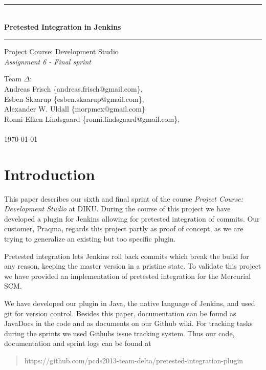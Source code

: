 \documentclass[a4paper,11pt]{article}
\makeatletter
\newcommand{\systemname}{Pretested Integration in Jenkins}
\newcommand{\groupname}{Team $\Delta$}
\newcommand{\groupmembers}{
	Andreas Frisch \{andreas.frisch@gmail.com\}, \\
	Esben Skaarup \{esben.skaarup@gmail.com\}, \\
	Alexander W. Uldall \{morpmex@gmail.com\} \\
	Ronni Elken Lindsgaard \{ronni.lindsgaard@gmail.com\}, \\
	~
}
\makeatother
\begin{document}
\begin{titlepage}
	\begin{center}
		\vspace*{4cm}
		\rule{\linewidth}{0.5mm}\\[0.4cm]
		{\huge \bfseries \systemname}
		\rule{\linewidth}{0.5mm}
	\end{center}
	\begin{flushleft}
		{
			\Large Project Course: Development Studio \\[0.1cm]
			{\it Assignment 6 - Final sprint}
		}
	\end{flushleft}
	\vspace*{4cm}
	
	\begin{flushleft}
		{\Large \groupname :} \\[0.1cm]
		{\Large \groupmembers} \\[0.3cm]
		{\Large \today}
	\end{flushleft}
\end{titlepage}
\newpage
\onehalfspacing
\setcounter{tocdepth}{2}

\tableofcontents
\newpage

\section{Introduction}
This paper describes our sixth and final sprint of the course {\it Project
Course: Development Studio} at DIKU. During the course of this project we have
developed a plugin for Jenkins allowing for pretested integration of commits.
Our customer, Praqma, regards this project partly as proof of concept, as we are
trying to generalize an existing but too specific plugin.

Pretested integration lets Jenkins roll back commits which break the build for
any reason, keeping the master version in a pristine state. To validate this
project we have provided an implementation of pretested integration for the
Mercurial SCM.

We have developed our plugin in Java, the native language of Jenkins, and used
git for version control. Besides this paper, documentation can be found as
JavaDocs in the code and as documents on our Github wiki. For tracking tasks
during the sprints we used Githubs issue tracking system. Thus our code,
documentation and sprint logs can be found at
\begin{quote}
	https://github.com/pcds2013-team-delta/pretested-integration-plugin
\end{quote}
\end{document}
